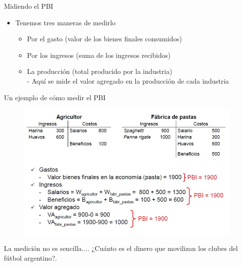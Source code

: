 \documentclass{beamer}
\begin{document}
\begin{frame}{Midiendo el PBI}
    \begin{itemize}
        \item Tenemos tres maneras de medirlo \vspace{1mm}
       \begin{itemize}
           \item Por el gasto (valor de los bienes finales consumidos) \vspace{1mm}
           \item Por los ingresos (suma de los ingresos recibidos) \vspace{1mm}
           \item La producción (total producido por la industria) \\
            - Aquí se mide el valor agregado en la producción de cada industria
       \end{itemize}
    \end{itemize}
\end{frame}

\begin{frame}{Un ejemplo de cómo medir el PBI}
    \begin{figure} [H]   \includegraphics[scale=0.55]{Slides Principios de Economia/Figures/C16.2.jpg}
\label{fig:25.2}
\end{figure}
\end{frame}

\begin{frame}{La medición no es sencilla....  ¿Cuánto es el dinero que movilizan los clubes del fútbol argentino?.}

\end{frame}
\end{document}
